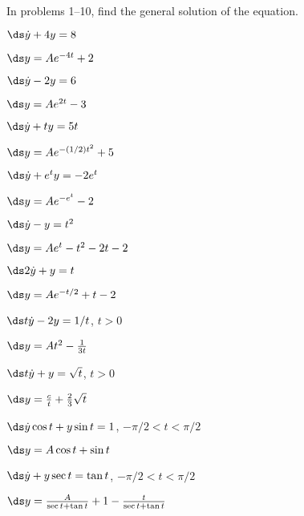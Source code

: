 \begin{exercises}

In problems 1--10, find the general solution of the equation.

\begin{exercise} $\ds\dot y +4y=8$
\begin{answer} $\ds y=Ae^{-4t}+2$
\end{answer}\end{exercise}

\begin{exercise} $\ds\dot y-2y=6$
\begin{answer} $\ds y=Ae^{2t}-3$
\end{answer}\end{exercise}

\begin{exercise} $\ds\dot y +ty=5t$
\begin{answer} $\ds y=Ae^{-(1/2)t^2}+5$
\end{answer}\end{exercise}

\begin{exercise} $\ds\dot y+e^ty=-2e^t$
\begin{answer} $\ds y=Ae^{-e^t}-2$
\end{answer}\end{exercise}

\begin{exercise} $\ds\dot y-y=t^2$
\begin{answer} $\ds y=Ae^{t}-t^2-2t-2$
\end{answer}\end{exercise}

\begin{exercise} $\ds 2\dot y +y=t$
\begin{answer} $\ds y=Ae^{-t/2}+t-2$
\end{answer}\end{exercise}

\begin{exercise} $\ds t\dot y -2y=1/t$, $t>0$
\begin{answer} $\ds y=At^2-{1\over3t}$
\end{answer}\end{exercise}

\begin{exercise} $\ds t\dot y+y=\sqrt{t}$, $t>0$
\begin{answer} $\ds y={c\over t}+{2\over3}\sqrt t$
\end{answer}\end{exercise}

\begin{exercise} $\ds\dot y\cos t+y\sin t=1$, $-\pi/2<t<\pi/2$
\begin{answer} $\ds y= A\cos t+\sin t$
\end{answer}\end{exercise}

\begin{exercise} $\ds\dot y + y\sec t=\tan t$, $-\pi/2<t<\pi/2$
\begin{answer} $\ds y= {A\over\sec t+\tan t}+1-{t\over\sec t+\tan t}$
\end{answer}\end{exercise}

\end{exercises}
